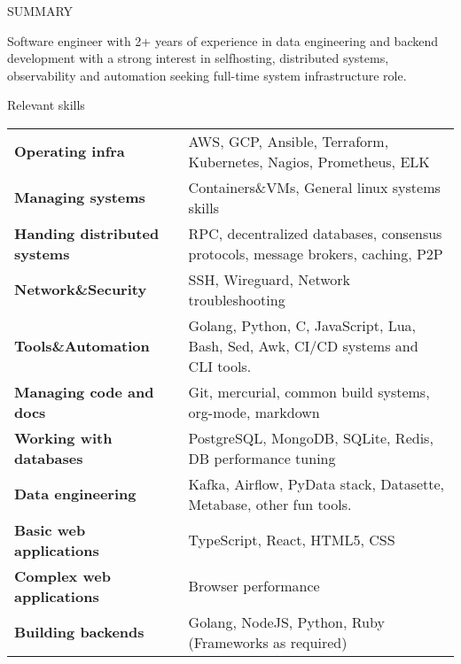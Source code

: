 \documentclass{resume} %
\begin{document}

\begin{rSection}{SUMMARY}

  {Software engineer with 2+ years of experience in data engineering and backend development with a strong interest in selfhosting, distributed systems, observability and automation seeking full-time system infrastructure role.}
\end{rSection}

\begin{rSection}{Relevant skills}
  \begin{tabular}{ @{} >{\bfseries}l @{\hspace{6ex}} l }
    Operating infra & AWS, GCP, Ansible, Terraform, Kubernetes, Nagios, Prometheus, ELK\\
    Managing systems & Containers\&VMs, General linux systems skills\\
    Handing distributed systems & RPC, decentralized databases, consensus protocols, message brokers, caching, P2P\\
    Network\&Security & SSH, Wireguard, Network troubleshooting\\
    Tools\&Automation & Golang, Python, C, JavaScript, Lua, Bash, Sed, Awk, CI/CD systems and CLI tools.\\
    Managing code and docs & Git, mercurial, common build systems, org-mode, markdown\\
    Working with databases & PostgreSQL, MongoDB, SQLite, Redis, DB performance tuning\\
    Data engineering & Kafka, Airflow, PyData stack, Datasette, Metabase, other fun tools.\\
    Basic web applications & TypeScript, React, HTML5, CSS\\
    Complex web applications & Browser performance\\
    Building backends & Golang, NodeJS, Python, Ruby (Frameworks as required)\\
  \end{tabular}\
\end{rSection}
\end{document}
